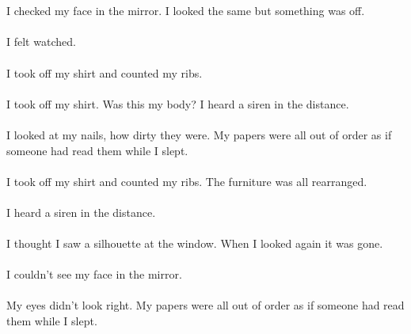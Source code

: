 \documentclass{article}
\begin{document}
    \section{}
    I checked my face in the mirror. I looked the same but something was off. \\\\I felt watched. \\\\I took off my shirt and counted my ribs. \\\\I took off my shirt. Was this my body? I heard a siren in the distance. \\\\I looked at my nails, how dirty they were. My papers were all out of order as if someone had read them while I slept. \\\\I took off my shirt and counted my ribs. The furniture was all rearranged. \\\\I heard a siren in the distance. \\\\I thought I saw a silhouette at the window. When I looked again it was gone. \\\\I couldn't see my face in the mirror. \\\\My eyes didn't look right. My papers were all out of order as if someone had read them while I slept. \\\\
    \newpage
    
\end{document}
